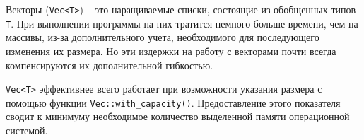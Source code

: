 \documentclass[%
	11pt,
	a4paper,
	utf8,
		]{article}
\begin{document}
Векторы (\verb|Vec<T>|) -- это наращиваемые списки, состоящие из обобщенных типов \texttt{T}. При выполнении программы на них тратится немного больше времени, чем на массивы, из-за дополнительного учета, необходимого для последующего изменения их размера. Но эти издержки на работу с векторами почти всегда компенсируются их дополнительной гибкостью. 

\verb|Vec<T>| эффективнее всего работает при возможности указания размера с помощью функции \verb|Vec::with_capacity()|. Предоставление этого показателя сводит к минимуму необходимое количество выделенной памяти операционной системой.











\begin{thebibliography}{99}
\end{thebibliography}


\lstlistoflistings{}
\end{document}

